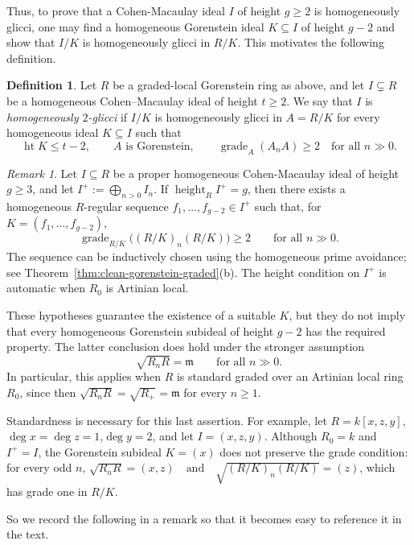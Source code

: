 \documentclass[11pt,letterpaper]{amsart}
\DeclareMathOperator{\gr}{grade}
\DeclareMathOperator{\height}{height}
\theoremstyle{plain}
\theoremstyle{definition}
\newtheorem{defi}[thm]{Definition}
\theoremstyle{remark}
\newtheorem{remark}[thm]{Remark}
\begin{document}
Thus, to prove that a Cohen-Macaulay ideal \(I\) of height \(g\geq 2\) is homogeneously glicci, one may find a homogeneous Gorenstein ideal \(K\subseteq I\) of height \(g-2\) and show that \(I/K\) is homogeneously glicci in \(R/K\). This motivates the following definition.

\begin{defi}
Let $R$ be a graded-local Gorenstein ring as above, and let
$I\subsetneq R$ be a homogeneous Cohen--Macaulay ideal of
height $t\ge2$. We say that $I$ is \emph{homogeneously $2$-glicci}
if $I/K$ is homogeneously glicci in $A=R/K$ for every
homogeneous ideal $K\subseteq I$ such that
\[
\operatorname{ht}K\le t-2,\qquad
A\text{ is Gorenstein},\qquad
\operatorname{grade}_A(A_nA)\ge2\quad\text{for all }n\gg0.
\]
\end{defi}

\begin{remark}\label{existenceofgorensteinsubideal}
Let \(I\subseteq R\) be a proper homogeneous Cohen-Macaulay ideal of
height \(g\geq 3\), and let $I^{+}:=\bigoplus_{n>0}I_n$. If
$\height_R I^{+}=g$, then there exists a homogeneous \(R\)-regular sequence
\(f_1,\ldots,f_{g-2}\in I^{+}\) such that, for
\(K=(f_1,\ldots,f_{g-2})\),
\[
\gr_{R/K}\bigl((R/K)_n(R/K)\bigr)\geq 2
\qquad\text{for all }n\gg0.
\]The sequence can be inductively chosen using the homogeneous prime avoidance; see Theorem~\ref{thm:clean-gorenstein-graded}(b). The height condition on \(I^{+}\) is automatic when \(R_0\) is
Artinian local. 

These hypotheses guarantee the existence of a suitable \(K\), but they
do not imply that every homogeneous Gorenstein subideal of height
\(g-2\) has the required property. The latter conclusion does hold
under the stronger assumption
\[
\sqrt{R_nR}=\mathfrak m \qquad\text{for all }n\gg0.
\]
In particular, this applies when \(R\) is standard graded over an
Artinian local ring \(R_0\), since then
\(\sqrt{R_nR}=\sqrt{R_+}=\mathfrak m\) for every \(n\geq1\).

Standardness is necessary for this last assertion. For example, let $R=k[x,z,y]$,$\deg x=\deg z=1$,$\deg y=2$, and let \(I=(x,z,y)\). Although \(R_0=k\) and \(I^{+}=I\), the
Gorenstein subideal \(K=(x)\) does not preserve the grade condition:
for every odd \(n\), $\sqrt{R_nR}=(x,z)
\quad\text{and}\quad
\sqrt{(R/K)_n(R/K)}=(z)$, which has grade one in \(R/K\).
\end{remark}

So we record the following in a remark so that it becomes easy to reference it in the text.
\end{document}
